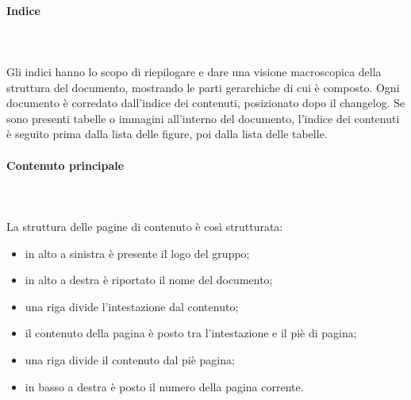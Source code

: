 		\paragraph{Indice} \mbox{}\\ \mbox{}\\
		Gli indici hanno lo scopo di riepilogare e dare una visione macroscopica della struttura del documento, mostrando le parti gerarchiche di cui è composto.\newline 
		Ogni documento è corredato dall'indice dei contenuti, posizionato dopo il changelog\glo{}. Se sono presenti tabelle o immagini all'interno del documento, l'indice dei contenuti è seguito prima dalla lista delle figure, poi dalla lista delle tabelle.
		\paragraph{Contenuto principale} \mbox{}\\ \mbox{}\\
		La struttura delle pagine di contenuto è così strutturata:
		\begin{itemize}
			\item in alto a sinistra è presente il logo del gruppo;
			\item in alto a destra è riportato il nome del documento;
			\item una riga divide l'intestazione dal contenuto;
			\item il contenuto della pagina è posto tra l'intestazione e il piè di pagina;
			\item una riga divide il contenuto dal piè pagina;
			\item in basso a destra è posto il numero della pagina corrente.
		\end{itemize}
